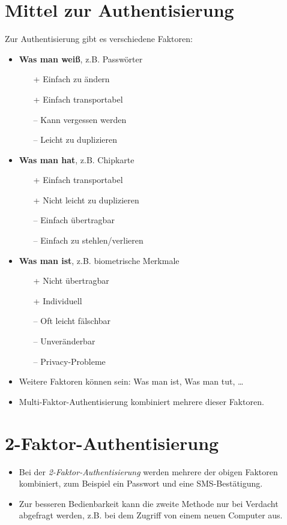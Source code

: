 	\section{Mittel zur Authentisierung}
		Zur Authentisierung gibt es verschiedene Faktoren:
		\begin{itemize}
			\item \textbf{Was man weiß}, z.B. Passwörter
				\begin{itemize}
					\item[+] Einfach zu ändern
					\item[+] Einfach transportabel
					\item[--] Kann vergessen werden
					\item[--] Leicht zu duplizieren
				\end{itemize}
			\item \textbf{Was man hat}, z.B. Chipkarte
				\begin{itemize}
					\item[+] Einfach transportabel
					\item[+] Nicht leicht zu duplizieren
					\item[--] Einfach übertragbar
					\item[--] Einfach zu stehlen/verlieren
				\end{itemize}
			\item \textbf{Was man ist}, z.B. biometrische Merkmale
				\begin{itemize}
					\item[+] Nicht übertragbar
					\item[+] Individuell
					\item[--] Oft leicht fälschbar
					\item[--] Unveränderbar
					\item[--] Privacy-Probleme
				\end{itemize}
			\item Weitere Faktoren können sein: Was man ist, Was man tut, \dots
			\item Multi-Faktor-Authentisierung kombiniert mehrere dieser Faktoren.
		\end{itemize}

	\section{2-Faktor-Authentisierung}
		\begin{itemize}
			\item Bei der \textit{2-Faktor-Authentisierung} werden mehrere der obigen Faktoren kombiniert, zum Beispiel ein Passwort und eine SMS-Bestätigung.
			\item Zur besseren Bedienbarkeit kann die zweite Methode nur bei Verdacht abgefragt werden, z.B. bei dem Zugriff von einem neuen Computer aus.
		\end{itemize}

